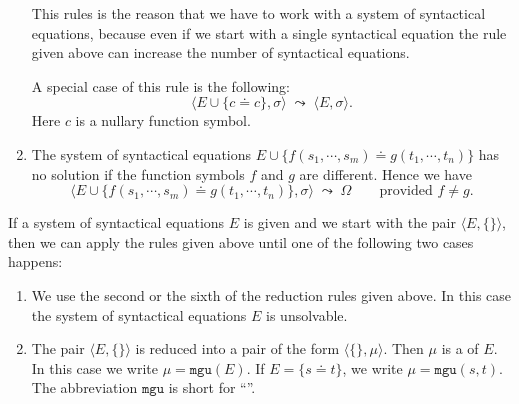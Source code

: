 \begin{enumerate}
      This rules is the reason that we have to work with a system of syntactical equations, because even if we
      start with a single syntactical equation the rule given above can increase the number of syntactical
      equations. 

      A special case of this rule is the following:  
      \[ \Big\langle E \cup \big\{ c \doteq c \big\}, \sigma \Big\rangle \;\leadsto\; 
         \Big\langle E, \sigma \Big\rangle.
      \]
      Here $c$ is a nullary function symbol.
\item The system of syntactical equations $E \cup \big\{ f(s_1,\cdots,s_m) \doteq g(t_1,\cdots,t_n) \big\}$ has
      no solution if the function symbols $f$ and $g$ are different.  Hence we have
      \[ \Big\langle E \cup \big\{ f(s_1,\cdots,s_m) \doteq g(t_1,\cdots,t_n) \big\},
      \sigma \Big\rangle \;\leadsto\; \Omega \qquad \mbox{provided $f \not= g$}. \]
\end{enumerate}
If a system of syntactical equations $E$ is given and we start with the pair 
$\langle E, \{\}\rangle$, then we can apply the rules given above until one of the following two cases happens: 
\begin{enumerate}
\item We use the second or the sixth of the reduction rules given above.
      In this case the system of syntactical equations $E$ is unsolvable.
\item The pair $\langle E, \{\} \rangle$ is reduced into a pair of the form $\langle \{\}, \mu\rangle$.
      Then $\mu$ is a   of $E$.  In this case we write $\mu = \mathtt{mgu}(E)$.
      If $E = \{ s \doteq t \}$, we write $\mu = \mathtt{mgu}(s, t)$.  The abbreviation
      $\mathtt{mgu}$ is short for {``''}.
\end{enumerate}


